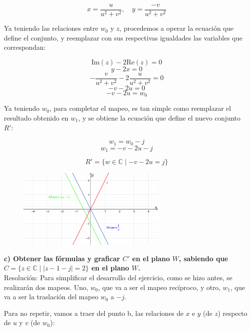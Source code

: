 \documentclass[12pt]{report}
\begin{document}
$$ x = \frac{u}{u^2 + v^2}, \quad y = \frac{-v}{u^2 + v^2} $$

Ya teniendo las relaciones entre \( w_0 \) y \( z \), procedemos a operar la ecuación que define el conjunto, y reemplazar con sus respectivas igualdades las variables que correspondan:

$$ \text{Im}(z) - 2\text{Re}(z) = 0 $$
$$ y - 2x = 0 $$
$$ -\frac{v}{u^2 + v^2} - 2\frac{u}{u^2 + v^2} = 0 $$
$$ -v - 2u = 0 $$
$$ -v - 2u = w_0 $$

Ya teniendo \( w_0 \), para completar el mapeo, es tan simple como reemplazar el resultado obtenido en \( w_1 \), y se obtiene la ecuación que define el nuevo conjunto \( R' \):

$$ w_1 = w_0 - j $$
$$ w_1 = -v - 2u - j $$

$$ R' = \{w \in \mathbb{C} \mid -v - 2u = j\} $$

\begin{figure}[h] %
    \centering %
    \includegraphics[width=0.65\textwidth]{./Imagenes/foto1Ej3.png} %
\end{figure}

\textbf{c) Obtener las fórmulas y graficar \( C' \) en el plano \( W \), sabiendo que \( C = \{z \in \mathbb{C} \mid |z - 1 - j| = 2\} \) en el plano \( W \).}\\[6pt]

Resolución: Para simplificar el desarrollo del ejercicio, como se hizo antes, se realizarán dos mapeos. Uno, \( w_0 \), que va a ser el mapeo recíproco, y otro, \( w_1 \), que va a ser la traslación del mapeo \( w_0 \) a \( -j \).

Para no repetir, vamos a traer del punto b, las relaciones de \( x \) e \( y \) (de \( z \)) respecto de \( u \) y \( v \) (de \( w_0 \)):
\end{document}
